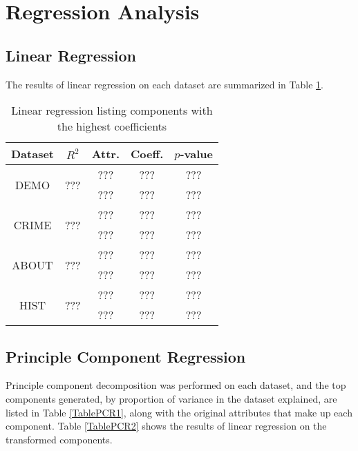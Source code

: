 \documentclass[]{article}
\begin{document}
\section{Regression Analysis}

\subsection{Linear Regression}
The results of linear regression on each dataset are summarized in Table \ref{TableLinReg}.
\begin{table}[h]
  \centering
  \begin{tabular}{|c|c|c|c|c|}
  \hline
  Dataset & $R^2$ & Attr. & Coeff. & $p$-value \\
  \hline
  \multirow{2}{*}{DEMO} & \multirow{2}{*}{???} & ??? & ??? & ??? \\
  && ??? & ??? & ??? \\
  \hline
  \multirow{2}{*}{CRIME} & \multirow{2}{*}{???} & ??? & ??? & ??? \\
  && ??? & ??? & ??? \\  
  \hline
  \multirow{2}{*}{ABOUT} & \multirow{2}{*}{???} & ??? & ??? & ??? \\
  && ??? & ??? & ??? \\  
  \hline
  \multirow{2}{*}{HIST} & \multirow{2}{*}{???} & ??? & ??? & ??? \\
  && ??? & ??? & ??? \\
  \hline
  \end{tabular}
  \caption{Linear regression listing components with the highest coefficients}
  \label{TableLinReg}
\end{table}


\subsection{Principle Component Regression}
Principle component decomposition was performed on each dataset, and the top components generated, by proportion of variance in the dataset explained, are listed in Table \ref{TablePCR1}, along with the original attributes that make up each component. Table \ref{TablePCR2} shows the results of linear regression on the transformed components.
\end{document}
